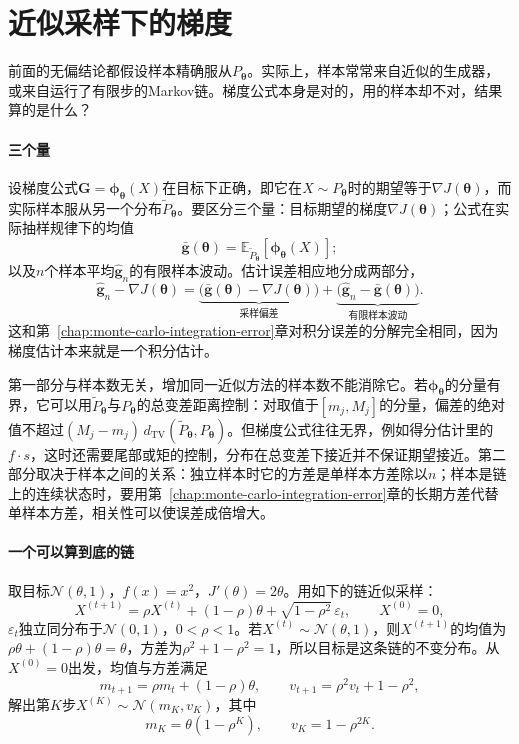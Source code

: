 \section{近似采样下的梯度}
\label{sec:pgrad-approx}

前面的无偏结论都假设样本精确服从$P_{\bm{\theta}}$。实际上，样本常常来自近似的生成器，或来自运行了有限步的Markov链。梯度公式本身是对的，用的样本却不对，结果算的是什么？

\paragraph{三个量}

设梯度公式$\bm{G}=\bm{\phi}_{\bm{\theta}}(X)$在目标下正确，即它在$X\sim P_{\bm{\theta}}$时的期望等于$\nabla J(\bm{\theta})$，而实际样本服从另一个分布$\widetilde{P}_{\bm{\theta}}$。要区分三个量：目标期望的梯度$\nabla J(\bm{\theta})$；公式在实际抽样规律下的均值
\[
  \bar{\bm{g}}(\bm{\theta})=\mathbb{E}_{\widetilde{P}_{\bm{\theta}}}[\bm{\phi}_{\bm{\theta}}(X)];
\]
以及$n$个样本平均$\hat{\bm{g}}_{n}$的有限样本波动。估计误差相应地分成两部分，
\begin{equation}
  \hat{\bm{g}}_{n}-\nabla J(\bm{\theta})=\underbrace{\bigl(\bar{\bm{g}}(\bm{\theta})-\nabla J(\bm{\theta})\bigr)}_{\text{采样偏差}}+\underbrace{\bigl(\hat{\bm{g}}_{n}-\bar{\bm{g}}(\bm{\theta})\bigr)}_{\text{有限样本波动}}.
  \label{eq:pgrad-error-split}
\end{equation}
这和第~\ref{chap:monte-carlo-integration-error}章对积分误差的分解完全相同，因为梯度估计本来就是一个积分估计。

第一部分与样本数无关，增加同一近似方法的样本数不能消除它。若$\bm{\phi}_{\bm{\theta}}$的分量有界，它可以用$\widetilde{P}_{\bm{\theta}}$与$P_{\bm{\theta}}$的总变差距离控制：对取值于$[m_{j},M_{j}]$的分量，偏差的绝对值不超过$(M_{j}-m_{j})\,d_{\mathrm{TV}}(\widetilde{P}_{\bm{\theta}},P_{\bm{\theta}})$。但梯度公式往往无界，例如得分估计里的$f\cdot s$，这时还需要尾部或矩的控制，分布在总变差下接近并不保证期望接近。第二部分取决于样本之间的关系：独立样本时它的方差是单样本方差除以$n$；样本是链上的连续状态时，要用第~\ref{chap:monte-carlo-integration-error}章的长期方差代替单样本方差，相关性可以使误差成倍增大。

\paragraph{一个可以算到底的链}

取目标$\mathcal{N}(\theta,1)$，$f(x)=x^{2}$，$J'(\theta)=2\theta$。用如下的链近似采样：
\[
  X^{(t+1)}=\rho X^{(t)}+(1-\rho)\theta+\sqrt{1-\rho^{2}}\,\varepsilon_{t},\qquad X^{(0)}=0,
\]
$\varepsilon_{t}$独立同分布于$\mathcal{N}(0,1)$，$0<\rho<1$。若$X^{(t)}\sim\mathcal{N}(\theta,1)$，则$X^{(t+1)}$的均值为$\rho\theta+(1-\rho)\theta=\theta$，方差为$\rho^{2}+1-\rho^{2}=1$，所以目标是这条链的不变分布。从$X^{(0)}=0$出发，均值与方差满足
\[
  m_{t+1}=\rho m_{t}+(1-\rho)\theta,\qquad v_{t+1}=\rho^{2}v_{t}+1-\rho^{2},
\]
解出第$K$步$X^{(K)}\sim\mathcal{N}(m_{K},v_{K})$，其中
\begin{equation}
  m_{K}=\theta(1-\rho^{K}),\qquad v_{K}=1-\rho^{2K}.
  \label{eq:pgrad-ar-law}
\end{equation}

